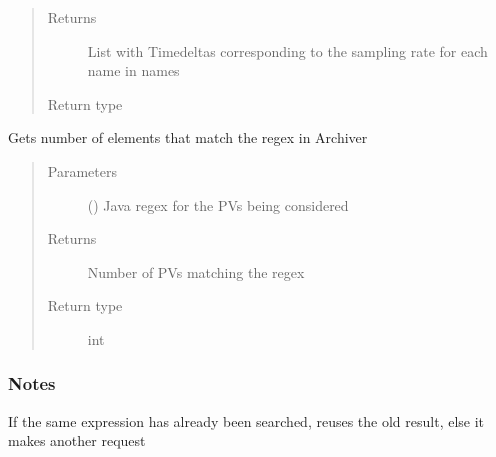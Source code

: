 \documentclass[letterpaper,10pt,english]{sphinxmanual}
\begin{document}
\begin{fulllineitems}
\begin{fulllineitems}
\begin{quote}
\begin{description}
\item[{Returns}] \leavevmode
\sphinxAtStartPar
List with Timedeltas corresponding to the sampling rate for each name in names

\item[{Return type}] \leavevmode
\sphinxAtStartPar
{}

\end{description}\end{quote}

\end{fulllineitems}


\begin{fulllineitems}
\label{\detokenize{dataset:dataset.Dataset.number_of_vars}}
\sphinxAtStartPar
Gets number of elements that match the regex in Archiver
\begin{quote}\begin{description}
\item[{Parameters}] \leavevmode
\sphinxAtStartPar
{} () \textendash{} Java regex for the PVs being considered

\item[{Returns}] \leavevmode
\sphinxAtStartPar
Number of PVs matching the regex

\item[{Return type}] \leavevmode
\sphinxAtStartPar
int

\end{description}\end{quote}
\subsubsection*{Notes}

\sphinxAtStartPar
If the same expression has already been searched, reuses the old result, else it makes another request

\end{fulllineitems}



\end{fulllineitems}
\end{document}
